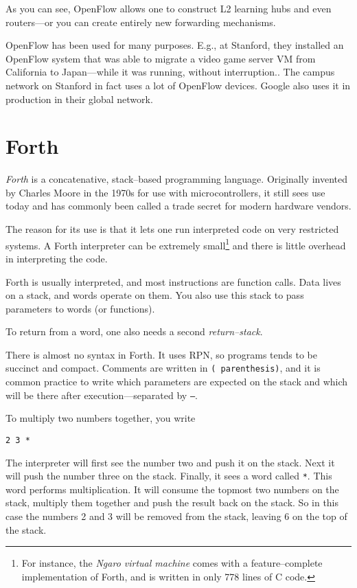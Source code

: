 As you can see, OpenFlow allows one to construct L2 learning hubs and even
routers---or you can create entirely new forwarding mechanisms.

OpenFlow has been used for many purposes.  E.g., at Stanford, they installed
an OpenFlow system that was able to migrate a video game server \ac{VM} from
California to Japan---while it was running, without interruption..  The campus network on Stanford in fact uses a lot of OpenFlow
devices.  Google also uses it in production in their global network.

\section{Forth}

\textit{Forth} is a concatenative, stack--based programming language.
Originally invented by Charles Moore in the 1970s for use with
microcontrollers, it still sees use today and has commonly been called a
trade secret for modern hardware vendors.

The reason for its use is that it lets one run interpreted code on very
restricted systems. A Forth interpreter can be extremely small\footnote{For
instance, the \textit{Ngaro virtual machine} comes with a feature--complete
implementation of Forth, and is written in only 778 lines of C code.}
and there is little overhead in interpreting the code.

Forth is usually interpreted, and most instructions are function calls.
Data lives on a stack, and words operate on them.  You also use this stack
to pass parameters to words (or functions).

To return from a word, one also needs a second \textit{return--stack}.

There is almost no syntax in Forth.  It uses \ac{RPN}, so programs tends to
be succinct and compact.  Comments are written in \texttt{( parenthesis)},
and it is common practice to write which parameters are expected on the
stack and which will be there after execution---separated by \texttt{--}.

To multiply two numbers together, you write

\begin{verbatim}
2 3 *
\end{verbatim}

The interpreter will first see the number two and push it on the stack. Next
it will push the number three on the stack. Finally, it sees a word called
\texttt{*}.  This word performs multiplication. It will consume the topmost
two numbers on the stack, multiply them together and push the result back on
the stack. So in this case the numbers 2 and 3 will be removed from the
stack, leaving 6 on the top of the stack.

